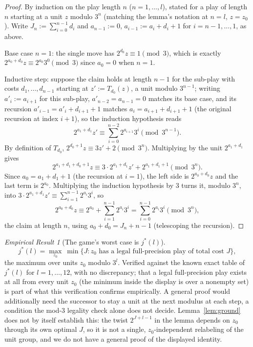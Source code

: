 \documentclass[11pt]{amsart}
\theoremstyle{plain}
\theoremstyle{definition}
\theoremstyle{remark}
\newtheorem{empresult}[theorem]{Empirical Result}
\begin{document}
\begin{proof}
By induction on the play length $n$ ($n=1,\dots,l$), stated for a play of length $n$ starting at a
unit $z$ modulo $3^n$ (matching the lemma's notation at $n=l$, $z=z_0$). Write
$J_n:=\sum_{i=0}^{n-1}d_i$ and $a_{n-1}:=0$, $a_{i-1}:=a_i+d_i+1$ for $i=n-1,\dots,1$, as above.

Base case $n=1$: the single move has $2^{d_0}z\equiv1\pmod3$, which is exactly
$2^{a_0+d_0}z\equiv2^{a_0}3^0\pmod3$ since $a_0=0$ when $n=1$.

Inductive step: suppose the claim holds at length $n-1$ for the sub-play with costs
$d_1,\dots,d_{n-1}$ starting at $z':=T_{d_0}(z)$, a unit modulo $3^{n-1}$; writing $a'_i:=a_{i+1}$
for this sub-play, $a'_{n-2}=a_{n-1}=0$ matches its base case, and its recursion
$a'_{i-1}=a'_i+d_{i+1}+1$ matches $a_i=a_{i+1}+d_{i+1}+1$ (the original recursion at index $i+1$),
so the induction hypothesis reads
\[
2^{a_1+d_1}z' \equiv \sum_{i=0}^{n-2}2^{a_{i+1}}3^i \pmod{3^{n-1}}.
\]
By definition of $T_{d_0}$, $2^{d_0+1}z\equiv3z'+2\pmod{3^n}$. Multiplying by the unit
$2^{a_1+d_1}$ gives
\[
2^{a_1+d_1+d_0+1}z \equiv 3\cdot2^{a_1+d_1}z' + 2^{a_1+d_1+1} \pmod{3^n}.
\]
Since $a_0=a_1+d_1+1$ (the recursion at $i=1$), the left side is $2^{a_0+d_0}z$ and the last term is
$2^{a_0}$. Multiplying the induction hypothesis by $3$ turns it, modulo $3^n$, into
$3\cdot2^{a_1+d_1}z'\equiv\sum_{i=1}^{n-1}2^{a_i}3^i$, so
\[
2^{a_0+d_0}z \equiv 2^{a_0} + \sum_{i=1}^{n-1}2^{a_i}3^i = \sum_{i=0}^{n-1}2^{a_i}3^i \pmod{3^n},
\]
the claim at length $n$, using $a_0+d_0=J_n+n-1$ (telescoping the recursion).
\end{proof}

\begin{empresult}[The game's worst case is $j^*(l)$]
\label{er:soundness}
\[
j^*(l) = \max_{z_0}\ \min\{J : \text{$z_0$ has a legal full-precision play of total cost $J$}\},
\]
the maximum over units $z_0$ modulo $3^l$. Verified against the known exact table of $j^*(l)$ for
$l=1,\dots,12$, with no discrepancy; that a legal full-precision play exists at all from every unit
$z_0$ (the minimum inside the display is over a nonempty set) is part of what this verification
confirms empirically. A general proof would additionally need the successor to stay a unit at the
next modulus at each step, a condition the mod-$3$ legality check alone does not decide.
Lemma~\ref{lem:ground} does not by itself establish this: the
twist $2^{J+l-1}$ in the lemma depends on $z_0$ through its own optimal $J$, so it is not a single,
$z_0$-independent relabeling of the unit group, and we do not have a general proof of the displayed
identity.
\end{empresult}
\end{document}
